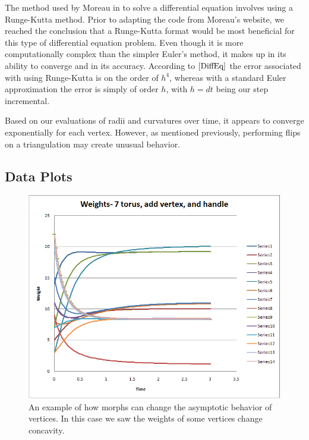\documentclass[12pt]{article}
\begin{document}
The method used by Moreau in \cite{JPM} to solve a differential equation involves using a Runge-Kutta method. Prior to adapting the code from Moreau's website, we reached the conclusion that a Runge-Kutta format would be most beneficial for this type of differential equation problem. Even though it is more computationally complex than the simpler Euler's method, it makes up in its ability to converge and in its accuracy. According to $\cite{DiffEq}$ the error associated with using Runge-Kutta is on the order of $h^4$, whereas with a standard Euler approximation the error is simply of order $h$, with $h = dt$ being our step incremental.\newline

\noindent Based on our evaluations of radii and curvatures over time, it appears to converge exponentially for each vertex. However, as mentioned previously, performing flips on a triangulation may create unusual behavior.

\subsection{Data Plots}
\label{dataplots}

\begin{figure}[h]
\begin{center}
\includegraphics[scale = 0.65]{Pictures/torus7addvaddhweights2.png}
\caption{An example of how morphs can change the asymptotic behavior of vertices. In this case we saw the weights of some vertices change concavity.}
\label{fig:t7vh}
\end{center}
\end{figure}
\end{document}
